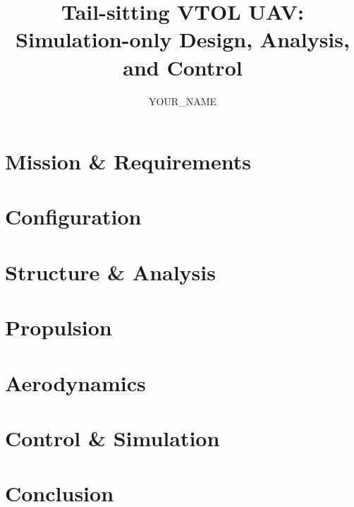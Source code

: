 \documentclass[11pt]{article}
\title{Tail-sitting VTOL UAV: Simulation-only Design, Analysis, and Control}
\author{YOUR\_NAME}
\date{}
\begin{document}
\maketitle
\section{Mission \& Requirements}
\section{Configuration}
\section{Structure \& Analysis}
\section{Propulsion}
\section{Aerodynamics}
\section{Control \& Simulation}
\section{Conclusion}
\end{document}
